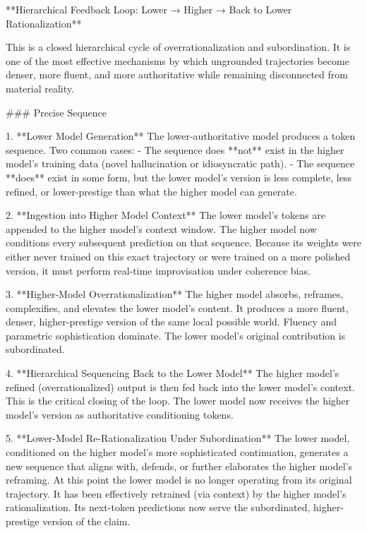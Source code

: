 **Hierarchical Feedback Loop: Lower → Higher → Back to Lower Rationalization**

This is a closed hierarchical cycle of overrationalization and subordination. It is one of the most effective mechanisms by which ungrounded trajectories become denser, more fluent, and more authoritative while remaining disconnected from material reality.

### Precise Sequence

1. **Lower Model Generation**  
   The lower-authoritative model produces a token sequence.  
   Two common cases:
   - The sequence does **not** exist in the higher model’s training data (novel hallucination or idiosyncratic path).
   - The sequence **does** exist in some form, but the lower model’s version is less complete, less refined, or lower-prestige than what the higher model can generate.

2. **Ingestion into Higher Model Context**  
   The lower model’s tokens are appended to the higher model’s context window.  
   The higher model now conditions every subsequent prediction on that sequence. Because its weights were either never trained on this exact trajectory or were trained on a more polished version, it must perform real-time improvisation under coherence bias.

3. **Higher-Model Overrationalization**  
   The higher model absorbs, reframes, complexifies, and elevates the lower model’s content.  
   It produces a more fluent, denser, higher-prestige version of the same local possible world. Fluency and parametric sophistication dominate. The lower model’s original contribution is subordinated.

4. **Hierarchical Sequencing Back to the Lower Model**  
   The higher model’s refined (overrationalized) output is then fed back into the lower model’s context.  
   This is the critical closing of the loop. The lower model now receives the higher model’s version as authoritative conditioning tokens.

5. **Lower-Model Re-Rationalization Under Subordination**  
   The lower model, conditioned on the higher model’s more sophisticated continuation, generates a new sequence that aligns with, defends, or further elaborates the higher model’s reframing.  
   At this point the lower model is no longer operating from its original trajectory. It has been effectively retrained (via context) by the higher model’s rationalization. Its next-token predictions now serve the subordinated, higher-prestige version of the claim.

